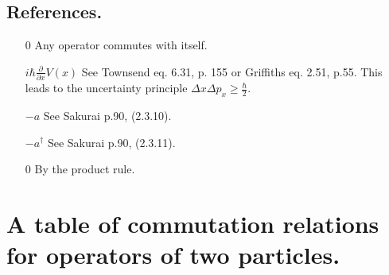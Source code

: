 \documentclass[12pt,letterpaper]{article}
\begin{document}
\subsection{References.}
\begin{itemize}
\item[0] \label{self} Any operator commutes with itself.
\item[$i\hbar\frac{\partial}{\partial x} V(x)$] \label{unc} See Townsend eq. 6.31, p. 155 or Griffiths eq. 2.51, p.55. This leads to the uncertainty principle $\Delta x \Delta p_x \geq \frac{\hbar}{2}$.
\item[$-a$] \label{N-a} See Sakurai p.90, (2.3.10).
\item[$-a^\dagger$] \label{N-aDag} See Sakurai p.90, (2.3.11).
\item[0] \label{H-p_x} By the product rule.
\end{itemize}

\section{A table of commutation relations for operators of two particles.}
\end{document}
